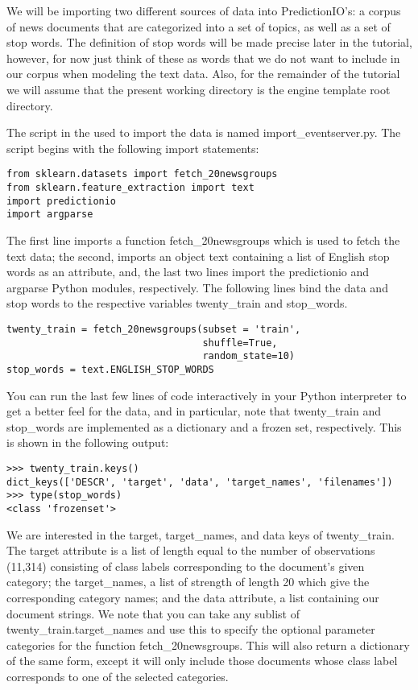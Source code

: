 \documentclass[a4paper,12pt]{article}
\newcommand{\3}{\left}
\newcommand{\4}{\right}
\renewcommand{\-}[1]{{}^{-#1}}
\begin{document}
We will be importing two different sources of data into PredictionIO's: a corpus of news documents that are categorized into a set of topics, as well as a set of stop words. The definition of stop words will be made precise later in the tutorial, however, for now just think of these as words that we do not want to include in our corpus when modeling the text data. Also, for the remainder of the tutorial we will assume that the present working directory is the engine template root directory.

The script in the  used to import the data is named import\_eventserver.py. The script begins with the following import statements:

\begin{verbatim}
from sklearn.datasets import fetch_20newsgroups
from sklearn.feature_extraction import text 
import predictionio
import argparse
\end{verbatim}

The first line imports a function fetch\_20newsgroups which is used to fetch the text data; the second, imports an object text containing a list of English stop words as an attribute, and, the last two lines import the predictionio and argparse Python modules, respectively. The following lines bind the data and stop words to the respective variables twenty\_train and stop\_words.

\begin{verbatim}
twenty_train = fetch_20newsgroups(subset = 'train',
                                  shuffle=True,
                                  random_state=10)
stop_words = text.ENGLISH_STOP_WORDS
\end{verbatim}

You can run the last few lines of code interactively in your Python interpreter to get a better feel for the data, and in particular, note that twenty\_train and stop\_words are implemented as a dictionary and a frozen set, respectively. This is shown in the following output:

\begin{verbatim}
>>> twenty_train.keys()
dict_keys(['DESCR', 'target', 'data', 'target_names', 'filenames'])
>>> type(stop_words)
<class 'frozenset'>
\end{verbatim}

We are interested in the target, target\_names, and data keys of twenty\_train. The target attribute is a list of length equal to the number of observations (11,314) consisting of class labels corresponding to the document's given category; the target\_names, a list of strength of length 20 which give the corresponding category names; and the data attribute, a list containing our document strings. We note that you can take any sublist of twenty\_train.target\_names and use this to specify the optional parameter categories for the function fetch\_20newsgroups. This will also return a dictionary of the same form, except it will only include those documents whose class label corresponds to one of the selected categories.
\end{document}
